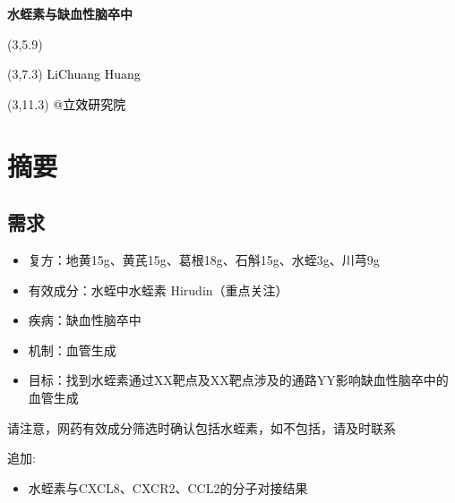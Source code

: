 \documentclass[
]{article}
\author{}
\date{\vspace{-2.5em}}
\providecommand{\tightlist}{%
  \setlength{\itemsep}{0pt}\setlength{\parskip}{0pt}}
\begin{document}
\begin{titlepage} 
\begin{center} \textbf{\Huge
水蛭素与缺血性脑卒中} \vspace{4em}
\begin{textblock}{10}(3,5.9) \huge
\textbf{\textcolor{white}{2024-04-23}}
\end{textblock} \begin{textblock}{10}(3,7.3)
\Large \textcolor{black}{LiChuang Huang}
\end{textblock} \begin{textblock}{10}(3,11.3)
\Large \textcolor{black}{@立效研究院}
\end{textblock} \end{center} \end{titlepage}
\restoregeometry


\tableofcontents

\listoffigures

\listoftables

\newpage


\hypertarget{abstract}{%
\section{摘要}\label{abstract}}

\hypertarget{ux9700ux6c42}{%
\subsection{需求}\label{ux9700ux6c42}}

\begin{itemize}
\tightlist
\item
  复方：地黄15g、黄芪15g、葛根18g、石斛15g、水蛭3g、川芎9g
\item
  有效成分：水蛭中水蛭素 Hirudin（重点关注）
\item
  疾病：缺血性脑卒中
\item
  机制：血管生成
\item
  目标：找到水蛭素通过XX靶点及XX靶点涉及的通路YY影响缺血性脑卒中的血管生成
\end{itemize}

请注意，网药有效成分筛选时确认包括水蛭素，如不包括，请及时联系

追加:

\begin{itemize}
\tightlist
\item
  水蛭素与CXCL8、CXCR2、CCL2的分子对接结果
\end{itemize}
\end{document}
